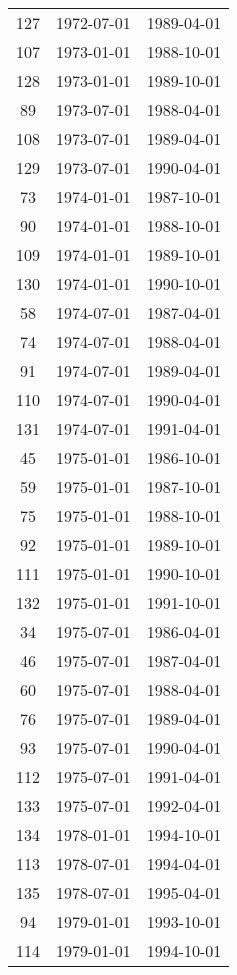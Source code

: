 % 
\begin{tabular}{ccc}
  \hline
  \hline
127 & 1972-07-01 & 1989-04-01 \\ 
  107 & 1973-01-01 & 1988-10-01 \\ 
  128 & 1973-01-01 & 1989-10-01 \\ 
  89 & 1973-07-01 & 1988-04-01 \\ 
  108 & 1973-07-01 & 1989-04-01 \\ 
  129 & 1973-07-01 & 1990-04-01 \\ 
  73 & 1974-01-01 & 1987-10-01 \\ 
  90 & 1974-01-01 & 1988-10-01 \\ 
  109 & 1974-01-01 & 1989-10-01 \\ 
  130 & 1974-01-01 & 1990-10-01 \\ 
  58 & 1974-07-01 & 1987-04-01 \\ 
  74 & 1974-07-01 & 1988-04-01 \\ 
  91 & 1974-07-01 & 1989-04-01 \\ 
  110 & 1974-07-01 & 1990-04-01 \\ 
  131 & 1974-07-01 & 1991-04-01 \\ 
  45 & 1975-01-01 & 1986-10-01 \\ 
  59 & 1975-01-01 & 1987-10-01 \\ 
  75 & 1975-01-01 & 1988-10-01 \\ 
  92 & 1975-01-01 & 1989-10-01 \\ 
  111 & 1975-01-01 & 1990-10-01 \\ 
  132 & 1975-01-01 & 1991-10-01 \\ 
  34 & 1975-07-01 & 1986-04-01 \\ 
  46 & 1975-07-01 & 1987-04-01 \\ 
  60 & 1975-07-01 & 1988-04-01 \\ 
  76 & 1975-07-01 & 1989-04-01 \\ 
  93 & 1975-07-01 & 1990-04-01 \\ 
  112 & 1975-07-01 & 1991-04-01 \\ 
  133 & 1975-07-01 & 1992-04-01 \\ 
  134 & 1978-01-01 & 1994-10-01 \\ 
  113 & 1978-07-01 & 1994-04-01 \\ 
  135 & 1978-07-01 & 1995-04-01 \\ 
  94 & 1979-01-01 & 1993-10-01 \\ 
  114 & 1979-01-01 & 1994-10-01 \\ 

\end{tabular}
